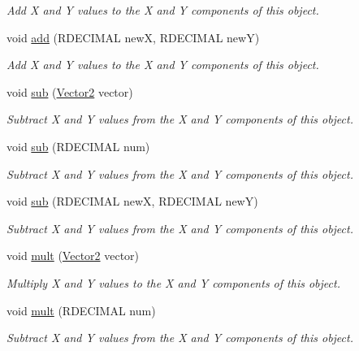 \begin{DoxyCompactItemize}
\begin{DoxyCompactList}\small\item\em Add X and Y values to the X and Y components of this object. \end{DoxyCompactList}\item 
void \hyperlink{class_rad_j_a_v_1_1_vector2_a96936a951f11a4ea4dad7fdd78904701}{add} (R\+D\+E\+C\+I\+M\+AL newX, R\+D\+E\+C\+I\+M\+AL newY)
\begin{DoxyCompactList}\small\item\em Add X and Y values to the X and Y components of this object. \end{DoxyCompactList}\item 
void \hyperlink{class_rad_j_a_v_1_1_vector2_a6cba03da72b10ed83ee80a3b2bb3b1e0}{sub} (\hyperlink{class_rad_j_a_v_1_1_vector2}{Vector2} vector)
\begin{DoxyCompactList}\small\item\em Subtract X and Y values from the X and Y components of this object. \end{DoxyCompactList}\item 
void \hyperlink{class_rad_j_a_v_1_1_vector2_aedc6db4bcceba217e9d34ca6eb25e098}{sub} (R\+D\+E\+C\+I\+M\+AL num)
\begin{DoxyCompactList}\small\item\em Subtract X and Y values from the X and Y components of this object. \end{DoxyCompactList}\item 
void \hyperlink{class_rad_j_a_v_1_1_vector2_aa86e848dee86f95c149f331ad8b8f791}{sub} (R\+D\+E\+C\+I\+M\+AL newX, R\+D\+E\+C\+I\+M\+AL newY)
\begin{DoxyCompactList}\small\item\em Subtract X and Y values from the X and Y components of this object. \end{DoxyCompactList}\item 
void \hyperlink{class_rad_j_a_v_1_1_vector2_a676fb57b7dc4aa9f2f5937d3d09393aa}{mult} (\hyperlink{class_rad_j_a_v_1_1_vector2}{Vector2} vector)
\begin{DoxyCompactList}\small\item\em Multiply X and Y values to the X and Y components of this object. \end{DoxyCompactList}\item 
void \hyperlink{class_rad_j_a_v_1_1_vector2_a4b88e593ccb0c1baa89aca01ffa109b5}{mult} (R\+D\+E\+C\+I\+M\+AL num)
\begin{DoxyCompactList}\small\item\em Subtract X and Y values from the X and Y components of this object. \end{DoxyCompactList}\item 

\end{DoxyCompactItemize}
